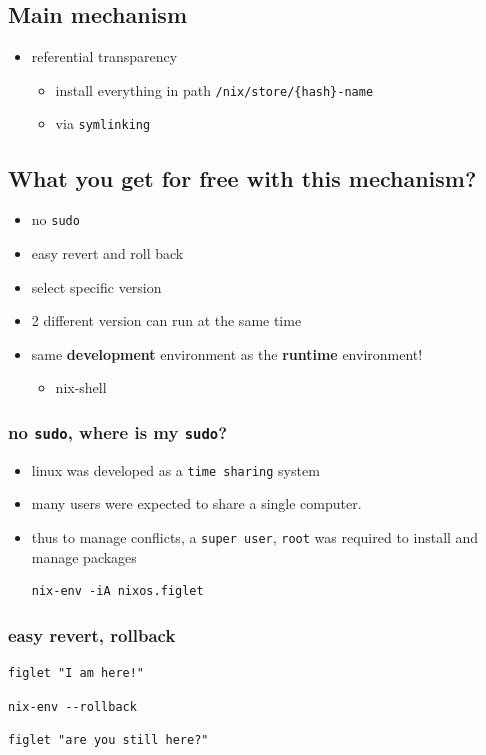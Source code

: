 \documentclass[11pt]{article}
\begin{document}
\subsection{Main mechanism}
\label{sec:org3180dbb}
\begin{itemize}
\item referential transparency
\begin{itemize}
\item install everything in path \texttt{/nix/store/\{hash\}-name}
\item via \texttt{symlinking}
\end{itemize}
\end{itemize}
\subsection{What you get for free with this mechanism?}
\label{sec:org93e2cf7}
\begin{itemize}
\item no \texttt{sudo}
\item easy revert and roll back
\item select specific version
\item 2 different version can run at the same time
\item same \textbf{development} environment as the \textbf{runtime} environment!
\begin{itemize}
\item nix-shell
\end{itemize}
\end{itemize}
\subsubsection{no \texttt{sudo}, where is my \texttt{sudo}?}
\label{sec:orgf48159e}
\begin{itemize}
\item linux was developed as a \texttt{time sharing} system
\item many users were expected to share a single computer.
\item thus to manage conflicts, a \texttt{super user}, \texttt{root} was required to
install and manage packages
\begin{verbatim}
nix-env -iA nixos.figlet
\end{verbatim}
\end{itemize}
\subsubsection{easy revert, rollback}
\label{sec:orgf1596da}
\begin{verbatim}
figlet "I am here!"
\end{verbatim}
\begin{verbatim}
nix-env --rollback
\end{verbatim}
\begin{verbatim}
figlet "are you still here?"
\end{verbatim}
\end{document}
